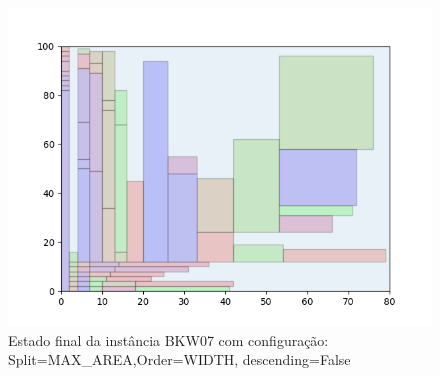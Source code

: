 \begin{figure}[H]
    \centering
    \caption[]{Estado final da instância BKW07 com configuração: Split=MAX_AREA,Order=WIDTH, descending=False}
    \label{fig:bkw07-max_area-width-false}
    \includegraphics[scale=0.5]{output/figures/bkw/bkw07/max_area/width/false/00}
\end{figure}